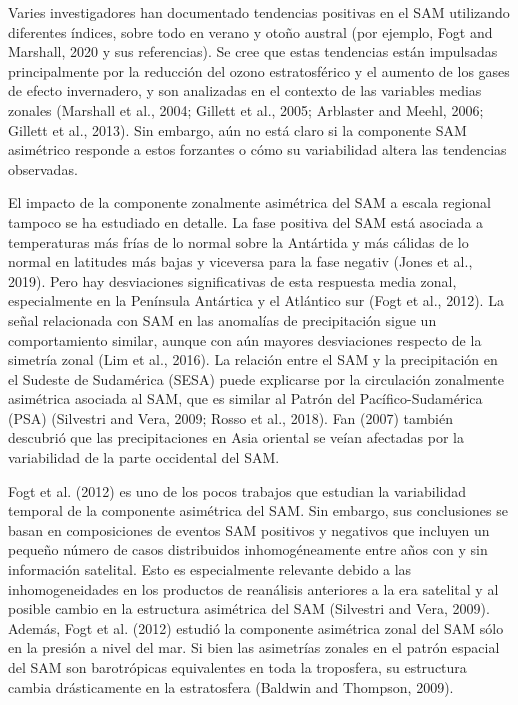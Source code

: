 \documentclass[12pt,oneside]{reedthesis}
\begin{document}
Varies investigadores han documentado tendencias positivas en el SAM utilizando diferentes índices, sobre todo en verano y otoño austral (por ejemplo, Fogt and Marshall, 2020 y sus referencias).
Se cree que estas tendencias están impulsadas principalmente por la reducción del ozono estratosférico y el aumento de los gases de efecto invernadero, y son analizadas en el contexto de las variables medias zonales (Marshall et al., 2004; Gillett et al., 2005; Arblaster and Meehl, 2006; Gillett et al., 2013).
Sin embargo, aún no está claro si la componente SAM asimétrico responde a estos forzantes o cómo su variabilidad altera las tendencias observadas.

El impacto de la componente zonalmente asimétrica del SAM a escala regional tampoco se ha estudiado en detalle.
La fase positiva del SAM está asociada a temperaturas más frías de lo normal sobre la Antártida y más cálidas de lo normal en latitudes más bajas y viceversa para la fase negativ (Jones et al., 2019).
Pero hay desviaciones significativas de esta respuesta media zonal, especialmente en la Península Antártica y el Atlántico sur (Fogt et al., 2012).
La señal relacionada con SAM en las anomalías de precipitación sigue un comportamiento similar, aunque con aún mayores desviaciones respecto de la simetría zonal (Lim et al., 2016).
La relación entre el SAM y la precipitación en el Sudeste de Sudamérica (SESA) puede explicarse por la circulación zonalmente asimétrica asociada al SAM, que es similar al Patrón del Pacífico-Sudamérica (PSA) (Silvestri and Vera, 2009; Rosso et al., 2018).
Fan (2007) también descubrió que las precipitaciones en Asia oriental se veían afectadas por la variabilidad de la parte occidental del SAM.

Fogt et al. (2012) es uno de los pocos trabajos que estudian la variabilidad temporal de la componente asimétrica del SAM.
Sin embargo, sus conclusiones se basan en composiciones de eventos SAM positivos y negativos que incluyen un pequeño número de casos distribuidos inhomogéneamente entre años con y sin información satelital.
Esto es especialmente relevante debido a las inhomogeneidades en los productos de reanálisis anteriores a la era satelital y al posible cambio en la estructura asimétrica del SAM (Silvestri and Vera, 2009).
Además, Fogt et al. (2012) estudió la componente asimétrica zonal del SAM sólo en la presión a nivel del mar.
Si bien las asimetrías zonales en el patrón espacial del SAM son barotrópicas equivalentes en toda la troposfera, su estructura cambia drásticamente en la estratosfera (Baldwin and Thompson, 2009).
\end{document}
